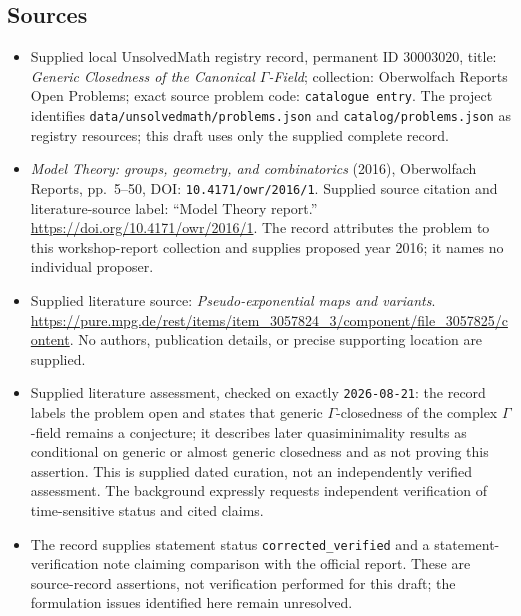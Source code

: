 \documentclass[11pt]{article}
\begin{document}
\subsection{Sources}
\begin{itemize}
\item Supplied local UnsolvedMath registry record, permanent ID \(30003020\), title: \emph{Generic Closedness of the Canonical \(\Gamma\)-Field}; collection: Oberwolfach Reports Open Problems; exact source problem code: \texttt{catalogue entry}. The project identifies \texttt{data/unsolvedmath/problems.json} and \texttt{catalog/problems.json} as registry resources; this draft uses only the supplied complete record.
\item \emph{Model Theory: groups, geometry, and combinatorics} (2016), Oberwolfach Reports, pp.~5--50, DOI: \texttt{10.4171/owr/2016/1}. Supplied source citation and literature-source label: ``Model Theory report.'' \url{https://doi.org/10.4171/owr/2016/1}. The record attributes the problem to this workshop-report collection and supplies proposed year 2016; it names no individual proposer.
\item Supplied literature source: \emph{Pseudo-exponential maps and variants}. \url{https://pure.mpg.de/rest/items/item_3057824_3/component/file_3057825/content}. No authors, publication details, or precise supporting location are supplied.
\item Supplied literature assessment, checked on exactly \texttt{2026-08-21}: the record labels the problem open and states that generic \(\Gamma\)-closedness of the complex \(\Gamma\)-field remains a conjecture; it describes later quasiminimality results as conditional on generic or almost generic closedness and as not proving this assertion. This is supplied dated curation, not an independently verified assessment. The background expressly requests independent verification of time-sensitive status and cited claims.
\item The record supplies statement status \texttt{corrected\_verified} and a statement-verification note claiming comparison with the official report. These are source-record assertions, not verification performed for this draft; the formulation issues identified here remain unresolved.
\end{itemize}
\end{document}
